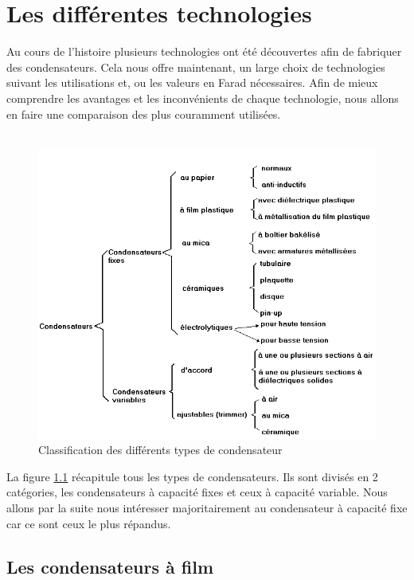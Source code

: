 \chapter{Les différentes technologies}

Au cours de l’histoire plusieurs technologies ont été découvertes afin de fabriquer des condensateurs. Cela nous offre maintenant, un large choix de technologies suivant les utilisations et, ou les valeurs en Farad nécessaires. Afin de mieux comprendre les avantages et les inconvénients de chaque technologie, nous allons en faire une comparaison des plus couramment utilisées. \\ \\

\begin{figure}[!h]
    \centering
    \includegraphics[scale=0.7]{./picture4/classification.PNG}
    \caption{Classification des différents types de condensateur}
    \label{classification}
\end{figure}

La figure \ref{classification} récapitule tous les types de condensateurs. Ils sont divisés en 2 catégories, les condensateurs à capacité fixes et ceux à capacité variable. Nous allons par la suite nous intéresser majoritairement au condensateur à capacité fixe car ce sont ceux le plus répandus.

\section{Les condensateurs à film}


